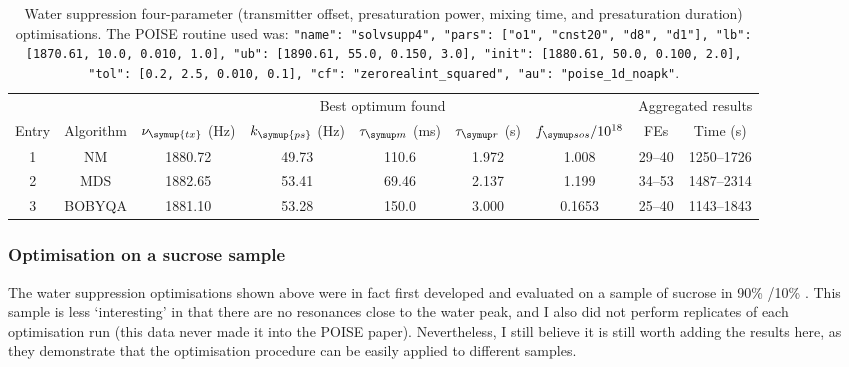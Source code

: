 \begin{table}
    \centering
    \begin{tabular}{ccccccccc}
        \toprule
              &           & \multicolumn{5}{c}{Best optimum found} & \multicolumn{2}{c}{Aggregated results} \\
                            \cmidrule(lr){3-7}                       \cmidrule(lr){8-9}
        Entry & Algorithm & $\nu_{\symup{tx}}$ (\unit{\Hz}) & $k_{\symup{ps}}$ (\unit{\Hz}) & $\taum$ (\unit{\ms}) & $\taur$ (\unit{\s}) & $\fsos / 10^{18}$ & FEs    & Time (\unit{\s}) \\
        \midrule
        1     & NM        & 1880.72                    & 49.73          & 110.6              & 1.972             & 1.008                    & 29--40 & 1250--1726     \\
        2     & MDS       & 1882.65                    & 53.41          & 69.46              & 2.137             & 1.199                    & 34--53 & 1487--2314     \\
        3     & BOBYQA    & 1881.10                    & 53.28          & 150.0              & 3.000             & 0.1653                   & 25--40 & 1143--1843     \\
        \bottomrule
    \end{tabular}
    \caption[Water suppression four-parameter optimisations]{
        Water suppression four-parameter (transmitter offset, presaturation power, mixing time, and presaturation duration) optimisations.
        The POISE routine used was: \texttt{{"name": "solvsupp4", "pars": ["o1", "cnst20", "d8", "d1"], "lb": [1870.61, 10.0, 0.010, 1.0], "ub": [1890.61, 55.0, 0.150, 3.0], "init": [1880.61, 50.0, 0.100, 2.0], "tol": [0.2, 2.5, 0.010, 0.1], "cf": "zerorealint_squared", "au": "poise_1d_noapk"}}.
    }
    \label{tbl:poise_solvsupp4p}
\end{table}




\subsubsection{Optimisation on a sucrose sample}

The water suppression optimisations shown above were in fact first developed and evaluated on a sample of sucrose in 90\% /10\% .
This sample is less `interesting' in that there are no resonances close to the water peak, and I also did not perform replicates of each optimisation run (this data never made it into the POISE paper).
Nevertheless, I still believe it is still worth adding the results here, as they demonstrate that the optimisation procedure can be easily applied to different samples.

